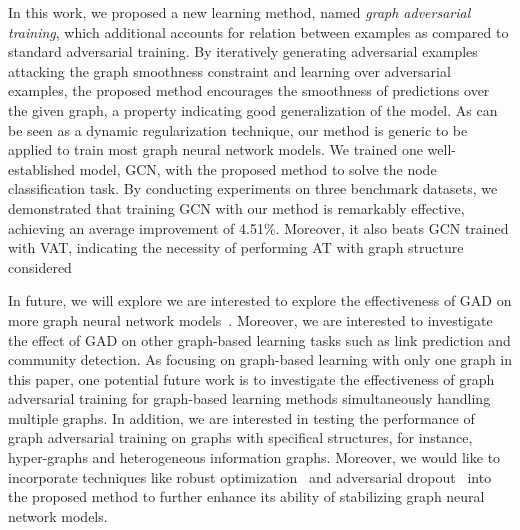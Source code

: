 \documentclass[10pt,journal,compsoc]{IEEEtran}
\begin{document}
In this work, we proposed a new learning method, named \textit{graph adversarial training}, which additional accounts for relation between examples as compared to standard adversarial training. By iteratively generating adversarial examples attacking the graph smoothness constraint and learning over adversarial examples, the proposed method encourages the smoothness of predictions over the given graph, a property indicating good generalization of the model. As can be seen as a dynamic regularization technique, our method is generic to be applied to train most graph neural network models. We trained one well-established model, GCN, with the proposed method to solve the node classification task. By conducting experiments on three benchmark datasets, we demonstrated that training GCN with our method is remarkably effective, achieving an average improvement of 4.51\%. Moreover, it also beats GCN trained with VAT, indicating the necessity of performing AT with graph structure considered

In future, we will explore we are interested to explore the effectiveness of GAD on more graph neural network models~\cite{hamilton2017inductive,velickovic2018graph,ying2018hierarchical}. Moreover, we are interested to investigate the effect of GAD on other graph-based learning tasks such as link prediction and community detection. As focusing on graph-based learning with only one graph in this paper, one potential future work is to investigate the effectiveness of graph adversarial training for graph-based learning methods simultaneously handling multiple graphs. In addition, we are interested in testing the performance of graph adversarial training on graphs with specifical structures, for instance, hyper-graphs and heterogeneous information graphs. Moreover, we would like to incorporate techniques like robust optimization~\cite{madry2017towards} and adversarial dropout~\cite{park2018adversarial} into the proposed method to further enhance its ability of stabilizing graph neural network models.
\end{document}
